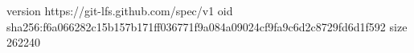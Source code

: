version https://git-lfs.github.com/spec/v1
oid sha256:f6a066282c15b157b171ff036771f9a084a09024cf9fa9c6d2c8729fd6d1f592
size 262240
